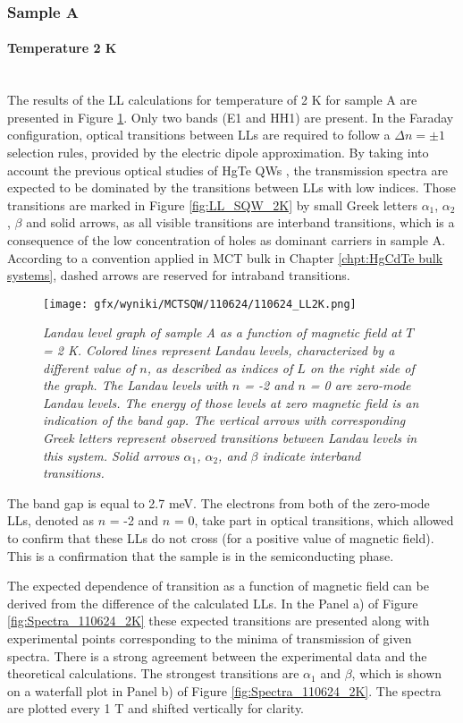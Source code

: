 \documentclass[titlepage,a4paper]{book}
\newcommand{\wciecie}{\quad\phantom{v}}
\newcommand{\myparagraph}[1]{\paragraph{#1}\mbox{}\\}
\begin{document}
\subsubsection{Sample A}
\myparagraph{Temperature 2 K}
\wciecie
The results of the LL calculations for temperature of 2 K for sample A are presented in Figure \ref{fig:LL_110624_2K}. Only two bands (E1 and HH1) are present. In the Faraday configuration, optical transitions between LLs are required to follow a $\Delta n = \pm 1$ selection rules, provided by the electric dipole approximation. By taking into account the previous optical studies of HgTe QWs \cite{Schultz}\cite{Orlita_MCT_QW}\cite{Zholudev_MCT_QW}\cite{Ikonnikov_MCT_SQW}\cite{Ludwig_MCT_QW}\cite{Zholudev_MCT_QW_anticrossing}, the transmission spectra are expected to be dominated by the transitions between LLs with low indices. Those transitions are marked in Figure \ref{fig:LL_SQW_2K} by small Greek letters $\alpha_1$, $\alpha_2$, $\beta$ and solid arrows, as all visible transitions are interband transitions, which is a consequence of the low concentration of holes as dominant carriers in sample A. According to a convention applied in MCT bulk in Chapter \ref{chpt:HgCdTe bulk systems}, dashed arrows are reserved for intraband transitions. 

\begin{figure}[ht]
	\centering
	\texttt{[image: gfx/wyniki/MCTSQW/110624/110624\_LL2K.png]}
	\vspace{-10pt}
	\caption{\textit{Landau level graph of sample A as a function of magnetic field at $T$ = 2 K. Colored lines represent Landau levels, characterized by a different value of $n$, as described as indices of $L$ on the right side of the graph. The Landau levels with $n$ = -2 and $n$ = 0 are zero-mode Landau levels. The energy of those levels at zero magnetic field is an indication of the band gap. The vertical arrows with corresponding Greek letters represent observed transitions between Landau levels in this system. Solid arrows $\alpha_1$, $\alpha_2$, and $\beta$ indicate interband transitions.}}
	\label{fig:LL_110624_2K}
\end{figure}

The band gap is equal to 2.7 meV. The electrons from both of the zero-mode LLs, denoted as $n$ = -2 and $n$ = 0, take part in optical transitions, which allowed to confirm that these LLs do not cross (for a positive value of magnetic field). This is a confirmation that the sample is in the semiconducting phase. 

The expected dependence of transition as a function of magnetic field can be derived from the difference of the calculated LLs. In the Panel a) of Figure \ref{fig:Spectra_110624_2K} these expected transitions are presented along with experimental points corresponding to the minima of transmission of given spectra. There is a strong agreement between the experimental data and the theoretical calculations. The strongest transitions are $\alpha_1$ and $\beta$, which is shown on a waterfall plot in Panel b) of Figure \ref{fig:Spectra_110624_2K}. The spectra are plotted every 1 T and shifted vertically for clarity.
\end{document}
